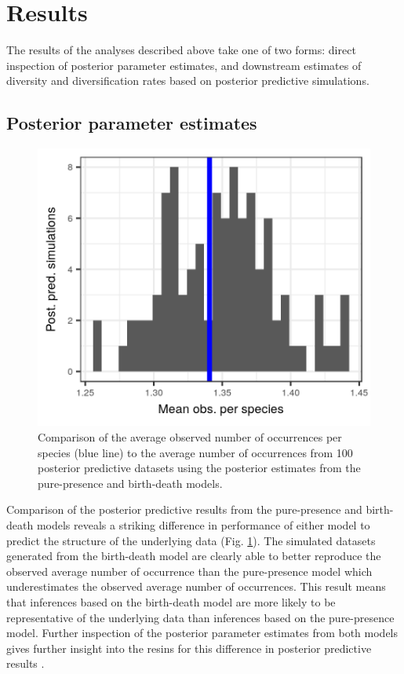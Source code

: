 \documentclass[12pt,letterpaper]{article}
\begin{document}
\section*{Results}

The results of the analyses described above take one of two forms: direct inspection of posterior parameter estimates, and downstream estimates of diversity and diversification rates based on posterior predictive simulations.

\subsection*{Posterior parameter estimates}



\begin{figure}[ht]
  \includegraphics[width=\textwidth,height=0.3\textheight,keepaspectratio=true]{figure/pred_occ_bd}
  \caption[Posterior predictive check of average occurrence]{Comparison of the average observed number of occurrences per species (blue line) to the average number of occurrences from 100 posterior predictive datasets using the posterior estimates from the pure-presence and birth-death models.}
  \label{fig:ppc}
\end{figure}

Comparison of the posterior predictive results from the pure-presence and birth-death models reveals a striking difference in performance of either model to predict the structure of the underlying data (Fig. \ref{fig:ppc}). The simulated datasets generated from the birth-death model are clearly able to better reproduce the observed average number of occurrence than the pure-presence model which underestimates the observed average number of occurrences. This result means that inferences based on the birth-death model are more likely to be representative of the underlying data than inferences based on the pure-presence model. Further inspection of the posterior parameter estimates from both models gives further insight into the resins for this difference in posterior predictive results \citep{Gelman2013d}. 
\end{document}
